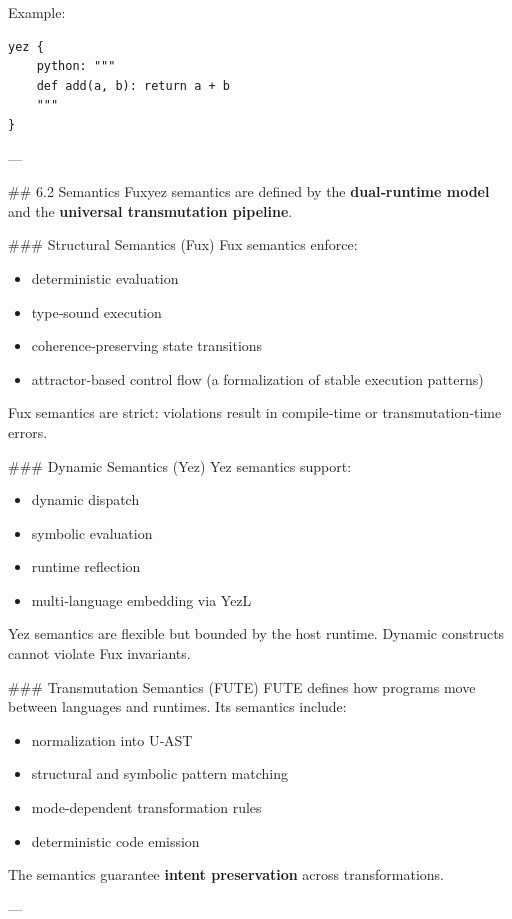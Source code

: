 Example:  
\begin{lstlisting}[language=fuxyez]
yez {
    python: """
    def add(a, b): return a + b
    """
}

\end{lstlisting}

---

\#\# 6.2 Semantics  
Fuxyez semantics are defined by the \textbf{dual‑runtime model} and the \textbf{universal transmutation pipeline}.

\#\#\# Structural Semantics (Fux)  
Fux semantics enforce:  
\begin{itemize}
  \item deterministic evaluation  
  \item type‑sound execution  
  \item coherence‑preserving state transitions  
  \item attractor‑based control flow (a formalization of stable execution patterns)
\end{itemize}

Fux semantics are strict: violations result in compile‑time or transmutation‑time errors.

\#\#\# Dynamic Semantics (Yez)  
Yez semantics support:  
\begin{itemize}
  \item dynamic dispatch  
  \item symbolic evaluation  
  \item runtime reflection  
  \item multi‑language embedding via YezL
\end{itemize}

Yez semantics are flexible but bounded by the host runtime. Dynamic constructs cannot violate Fux invariants.

\#\#\# Transmutation Semantics (FUTE)  
FUTE defines how programs move between languages and runtimes. Its semantics include:  
\begin{itemize}
  \item normalization into U‑AST  
  \item structural and symbolic pattern matching  
  \item mode‑dependent transformation rules  
  \item deterministic code emission
\end{itemize}

The semantics guarantee \textbf{intent preservation} across transformations.

---

